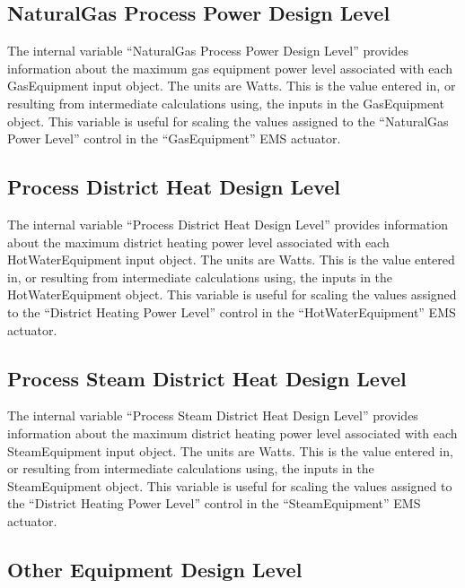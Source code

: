 \subsection{NaturalGas Process Power Design Level}\label{gas-process-power-design-level}

The internal variable ``NaturalGas Process Power Design Level'' provides information about the maximum gas equipment power level associated with each GasEquipment input object. The units are Watts. This is the value entered in, or resulting from intermediate calculations using, the inputs in the GasEquipment object. This variable is useful for scaling the values assigned to the ``NaturalGas Power Level'' control in the ``GasEquipment'' EMS actuator.

\subsection{Process District Heat Design Level}\label{process-district-heat-design-level}

The internal variable ``Process District Heat Design Level'' provides information about the maximum district heating power level associated with each HotWaterEquipment input object. The units are Watts. This is the value entered in, or resulting from intermediate calculations using, the inputs in the HotWaterEquipment object. This variable is useful for scaling the values assigned to the ``District Heating Power Level'' control in the ``HotWaterEquipment'' EMS actuator.

\subsection{Process Steam District Heat Design Level}\label{process-steam-district-heat-design-level}

The internal variable ``Process Steam District Heat Design Level'' provides information about the maximum district heating power level associated with each SteamEquipment input object. The units are Watts. This is the value entered in, or resulting from intermediate calculations using, the inputs in the SteamEquipment object. This variable is useful for scaling the values assigned to the ``District Heating Power Level'' control in the ``SteamEquipment'' EMS actuator.

\subsection{Other Equipment Design Level}\label{other-equipment-design-level}

